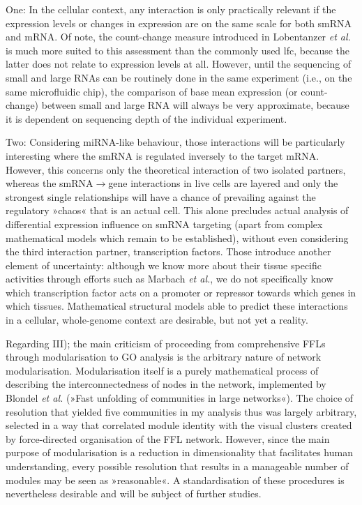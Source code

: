 One: In the cellular context, any interaction is only practically relevant if the expression levels or changes in expression are on the same scale for both smRNA and mRNA. Of note, the count-change measure introduced in Lobentanzer \emph{et al.}\cite{Lobentanzer2019a} is much more suited to this assessment than the commonly used \ac{lfc}, because the latter does not relate to expression levels at all. However, until the sequencing of small and large RNAs can be routinely done in the same experiment (i.e., on the same microfluidic chip), the comparison of base mean expression (or count-change) between small and large RNA will always be very approximate, because it is dependent on sequencing depth of the individual experiment. 

Two: Considering miRNA-like behaviour, those interactions will be particularly interesting where the smRNA is regulated inversely to the target mRNA. However, this concerns only the theoretical interaction of two isolated partners, whereas the smRNA$\to$gene interactions in live cells are layered and only the strongest single relationships will have a chance of prevailing against the regulatory »chaos« that is an actual cell. This alone precludes actual analysis of differential expression influence on smRNA targeting (apart from complex mathematical models which remain to be established), without even considering the third interaction partner, transcription factors. Those introduce another element of uncertainty: although we know more about their tissue specific activities through efforts such as Marbach \emph{et al.}\cite{Marbach2016}, we do not specifically know which transcription factor acts on a promoter or repressor towards which genes in which tissues. Mathematical structural models able to predict these interactions in a cellular, whole-genome context are desirable, but not yet a reality.

Regarding III); the main criticism of proceeding from comprehensive FFLs through modularisation to GO analysis is the arbitrary nature of network modularisation. Modularisation itself is a purely mathematical process of describing the interconnectedness of nodes in the network, implemented by Blondel \emph{et al.} (»Fast unfolding of communities in large networks«).\cite{Blondel2008} The choice of resolution that yielded five communities in my analysis thus was largely arbitrary, selected in a way that correlated module identity with the visual clusters created by force-directed organisation of the FFL network. However, since the main purpose of modularisation is a reduction in dimensionality that facilitates human understanding, every possible resolution that results in a manageable number of modules may be seen as »reasonable«. A standardisation of these procedures is nevertheless desirable and will be subject of further studies.

